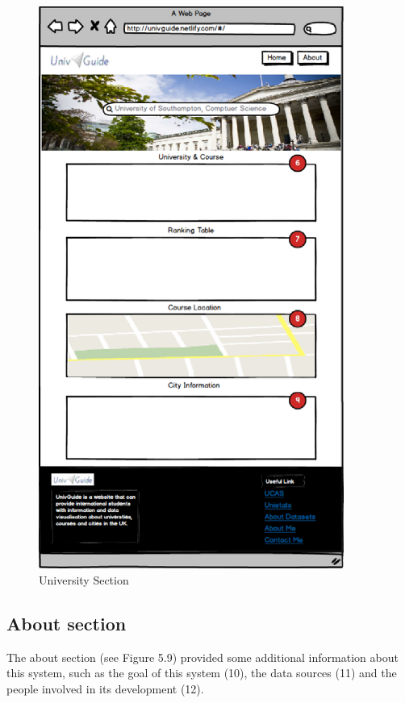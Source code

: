 \begin{figure}[H]
  \centering
  \includegraphics[width=10cm]{./img/Picture14}
  \caption{University Section}
  \label{Figure:figex}
\end{figure}



\subsection{About section
}

The about section (see Figure 5.9) provided some additional information about this system, such as the goal of this system (10), the data sources (11) and the people involved in its development (12).


